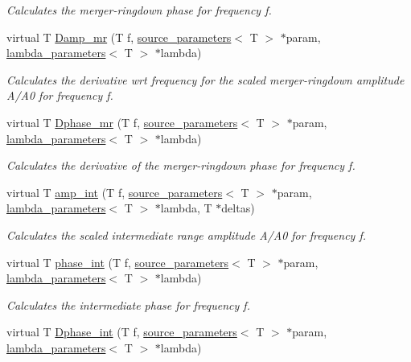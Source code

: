 \begin{DoxyCompactItemize}
\begin{DoxyCompactList}\small\item\em Calculates the merger-\/ringdown phase for frequency f. \end{DoxyCompactList}\item 
virtual T \hyperlink{classIMRPhenomD_a59796cb7f1ac68684562508a5a83d505}{Damp\+\_\+mr} (T f, \hyperlink{structsource__parameters}{source\+\_\+parameters}$<$ T $>$ $\ast$param, \hyperlink{structlambda__parameters}{lambda\+\_\+parameters}$<$ T $>$ $\ast$lambda)
\begin{DoxyCompactList}\small\item\em Calculates the derivative wrt frequency for the scaled merger-\/ringdown amplitude A/\+A0 for frequency f. \end{DoxyCompactList}\item 
virtual T \hyperlink{classIMRPhenomD_ab4a74828eacee645bac43b0af2c510e1}{Dphase\+\_\+mr} (T f, \hyperlink{structsource__parameters}{source\+\_\+parameters}$<$ T $>$ $\ast$param, \hyperlink{structlambda__parameters}{lambda\+\_\+parameters}$<$ T $>$ $\ast$lambda)
\begin{DoxyCompactList}\small\item\em Calculates the derivative of the merger-\/ringdown phase for frequency f. \end{DoxyCompactList}\item 
virtual T \hyperlink{classIMRPhenomD_a7deef6d5f185eeff45bb7a3357fbd052}{amp\+\_\+int} (T f, \hyperlink{structsource__parameters}{source\+\_\+parameters}$<$ T $>$ $\ast$param, \hyperlink{structlambda__parameters}{lambda\+\_\+parameters}$<$ T $>$ $\ast$lambda, T $\ast$deltas)
\begin{DoxyCompactList}\small\item\em Calculates the scaled intermediate range amplitude A/\+A0 for frequency f. \end{DoxyCompactList}\item 
virtual T \hyperlink{classIMRPhenomD_ad6a8bb9539e7494cad8a91aaa950cf50}{phase\+\_\+int} (T f, \hyperlink{structsource__parameters}{source\+\_\+parameters}$<$ T $>$ $\ast$param, \hyperlink{structlambda__parameters}{lambda\+\_\+parameters}$<$ T $>$ $\ast$lambda)
\begin{DoxyCompactList}\small\item\em Calculates the intermediate phase for frequency f. \end{DoxyCompactList}\item 
virtual T \hyperlink{classIMRPhenomD_a8d395e33bd420cdc996a6487302af36a}{Dphase\+\_\+int} (T f, \hyperlink{structsource__parameters}{source\+\_\+parameters}$<$ T $>$ $\ast$param, \hyperlink{structlambda__parameters}{lambda\+\_\+parameters}$<$ T $>$ $\ast$lambda)

\end{DoxyCompactItemize}
